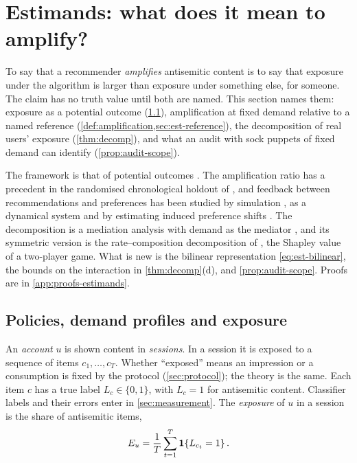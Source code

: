 \providecommand{\osc}{\operatorname{osc}}
\providecommand{\dTV}{d_{\mathrm{TV}}}

\section{Estimands: what does it mean to amplify?}\label{sec:estimands}

To say that a recommender \emph{amplifies} antisemitic content is to say that exposure under the algorithm is larger than exposure under something else, for someone. The claim has no truth value until both are named. This section names them: exposure as a potential outcome (\cref{sec:est-setup}), amplification at fixed demand relative to a named reference (\cref{def:amplification,sec:est-reference}), the decomposition of real users' exposure (\cref{thm:decomp}), and what an audit with sock puppets of fixed demand can identify (\cref{prop:audit-scope}).

The framework is that of potential outcomes \citep{rubin1974,imbensrubin2015}. The amplification ratio has a precedent in the randomised chronological holdout of \citet{huszar2022}, and feedback between recommendations and preferences has been studied by simulation \citep{chaney2018}, as a dynamical system \citep{jiang2019} and by estimating induced preference shifts \citep{carroll2022}. The decomposition is a mediation analysis with demand as the mediator \citep{robins1992,pearl2001,vanderweele2014,vanderweele2014b}, and its symmetric version is the rate--composition decomposition of \citet{kitagawa1955}, the Shapley value \citep{shapley1953} of a two-player game. What is new is the bilinear representation \eqref{eq:est-bilinear}, the bounds on the interaction in \cref{thm:decomp}(d), and \cref{prop:audit-scope}. Proofs are in \cref{app:proofs-estimands}.

\subsection{Policies, demand profiles and exposure}\label{sec:est-setup}

An \emph{account} $u$ is shown content in \emph{sessions}. In a session it is exposed to a sequence of items $c_1,\dots,c_T$. Whether ``exposed'' means an impression or a consumption is fixed by the protocol (\cref{sec:protocol}); the theory is the same. Each item $c$ has a true label $L_c\in\{0,1\}$, with $L_c=1$ for antisemitic content. Classifier labels and their errors enter in \cref{sec:measurement}. The \emph{exposure} of $u$ in a session is the share of antisemitic items,
\begin{equation}\label{eq:est-exposure}
  E_u=\frac1T\sum_{t=1}^{T}\mathbf{1}\!\left\{L_{c_t}=1\right\}.
\end{equation}

